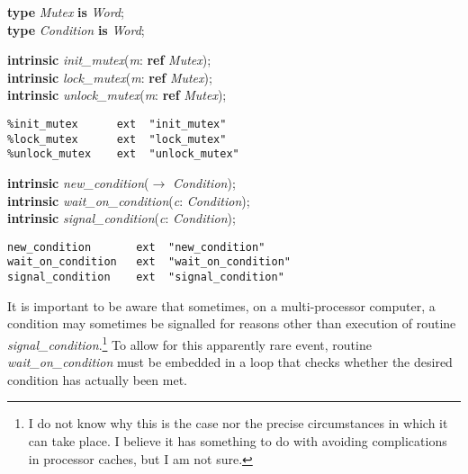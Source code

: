 \begin{tabbing}
\indents
\vb\>\textbf{type} \emph{Mutex} \textbf{is} \emph{Word};\\
\vb\>\textbf{type} \emph{Condition} \textbf{is} \emph{Word};\\[-17pt]
\end{tabbing}

\begin{tabbing}
\indents
{}
\vb\>\textbf{intrinsic} \emph{init\_mutex}(\emph{m}: \textbf{ref} \emph{Mutex}); \\
\vb\>\textbf{intrinsic} \emph{lock\_mutex}(\emph{m}: \textbf{ref} \emph{Mutex}); \\
\vb\>\textbf{intrinsic} \emph{unlock\_mutex}(\emph{m}: \textbf{ref} \emph{Mutex});
\end{tabbing}

{\small
\begin{verbatim}
%init_mutex      ext  "init_mutex"
%lock_mutex      ext  "lock_mutex"
%unlock_mutex    ext  "unlock_mutex"
\end{verbatim}}

\begin{tabbing}
\indents
{}
\vb\>\textbf{intrinsic} \emph{new\_condition}($\rightarrow$ \emph{Condition}); \\
\vb\>\textbf{intrinsic} \emph{wait\_on\_condition}(\emph{c}: \emph{Condition}); \\
\vb\>\textbf{intrinsic} \emph{signal\_condition}(\emph{c}: \emph{Condition});
\end{tabbing}

{\small
\begin{verbatim}
new_condition       ext  "new_condition"
wait_on_condition   ext  "wait_on_condition"
signal_condition    ext  "signal_condition"
\end{verbatim}}

It is important to be aware that sometimes, on a multi-processor computer, a condition may sometimes be signalled for reasons other than execution of routine \emph{signal\_condition}.\footnote{I do not know why this is the case nor the precise circumstances in which it can take place. I believe it has something to do with avoiding complications in processor caches, but I am not sure.} To allow for this apparently rare event, routine \emph{wait\_on\_condition} must be embedded in a loop that checks whether the desired condition has actually been met.


